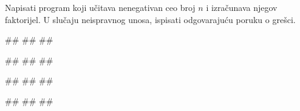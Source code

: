 
\begin{Exercise}[label=PET_05] 
 Napisati program koji učitava nenegativan ceo broj $n$ i izračunava njegov
 faktorijel. 
 U slučaju neispravnog unosa, ispisati odgovarajuću poruku o grešci. 


\begin{miditest}
\begin{upotreba}{1}
#\naslovInt#
##
##
\end{upotreba}
\end{miditest}
\begin{miditest}
\begin{upotreba}{2}
#\naslovInt#
##
##
\end{upotreba}
\end{miditest}

\begin{miditest}
\begin{upotreba}{3}
#\naslovInt#
##
##
\end{upotreba}
\end{miditest}
\begin{miditest}
\begin{upotreba}{4}
#\naslovInt#
##
##
\end{upotreba}
\end{miditest}

\end{Exercise}
\ifresenja
\begin{Answer}[ref=PET_05]
\end{Answer}
\fi


